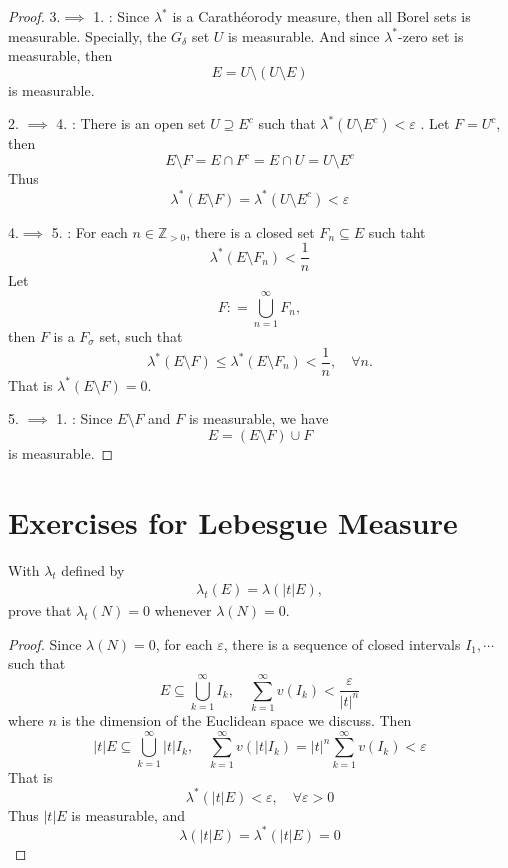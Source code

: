 \documentclass[../main.tex]{subfiles}
\begin{document}
\begin{proof}
    3.\(  \implies   \) 1. : Since \(   \lambda ^{*}  \) is a Carathéorody measure, then all Borel sets is measurable. Specially, the \(  G_{ \delta }  \) set \(  U  \)  is measurable. And since \(   \lambda ^{*}  \)-zero set is measurable,  then \[
  E =  U\setminus \left( U\setminus E \right)  
    \]   is measurable.
    
    2. \(  \implies   \) 4. : There is an open set \(  U\supseteq  E^{c}  \)   such that \(   \lambda ^{*}\left( U\setminus E^{c} \right)<  \varepsilon    \) . Let \(  F = U^{c}  \), then \[
    E\setminus F= E\cap F^{c}=  E\cap U=  U\setminus E^{c} 
    \] Thus \[
     \lambda ^{*}\left( E\setminus F \right)=  \lambda ^{*}\left( U\setminus E^{c} \right)<  \varepsilon   
    \]

    4.\(  \implies   \) 5. : For each \(  n \in \mathbb{Z} _{> 0}  \), there is a closed set \(  F_{n}\subseteq E  \) such taht \[
     \lambda ^{*}\left( E\setminus F_{n} \right)< \frac{1 }{n }  
    \] Let \[
    F: = \bigcup _{n = 1}^{\infty}F_{n} , 
    \] then \(  F  \) is a \(  F_{ \sigma }  \) set, such that \[
     \lambda ^{*}\left( E\setminus F \right)\le  \lambda ^{*}\left( E\setminus F_{n} \right)< \frac{1 }{n },\quad \forall n .   
    \] That is \(   \lambda ^{*}\left( E\setminus F \right)= 0   \).
    
    5. \(  \implies   \) 1. : Since \(  E\setminus F  \) and \(  F  \) is measurable, we have \[
    E = \left( E\setminus F \right)\cup F 
    \]    is measurable.
 \end{proof}

 \section*{Exercises for Lebesgue Measure}

 \begin{exercise}{}{}
    With $\lambda_t$ defined by
\[\begin{aligned}
\lambda_t(E) = \lambda(|t| E),
\end{aligned}\]
prove that $\lambda_t(N) = 0$ whenever $\lambda(N) = 0$.
 \end{exercise}
\begin{proof}
    Since \(   \lambda \left( N \right)= 0   \), for each \(   \varepsilon   \), there is a sequence of closed intervals \(  I_1,\cdots   \) such that \[
    E\subseteq  \bigcup _{k = 1}^{\infty}I _{k},\quad \sum _{k = 1}^{\infty}v\left( I _{k} \right)< \frac{ \varepsilon  }{\left| t \right|^{n}  }  
    \] where \(  n  \) is the dimension of the Euclidean space we discuss.  Then \[
    \left| t \right|E \subseteq  \bigcup _{k = 1}^{\infty} \left| t \right|I _{k},\quad \sum _{k = 1}^{\infty}v\left( \left| t \right| I _{k}  \right)=    \left| t \right|^{n} \sum _{k = 1}^{\infty} v\left( I _{k} \right)  <  \varepsilon 
    \]   That is \[
     \lambda ^{*}\left( \left| t \right|E  \right)<  \varepsilon ,\quad \forall  \varepsilon > 0 
    \] Thus \(  \left| t \right|E   \) is measurable, and \[
     \lambda \left( \left| t \right|E  \right)=  \lambda ^{*}\left( \left| t \right|E  \right)= 0  
    \] 
\end{proof}
\end{document}
